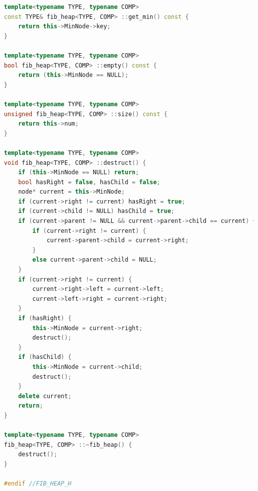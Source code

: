 \documentclass[a4paper]{article}
\begin{document}
\begin{lstlisting}[language=C++]
template<typename TYPE, typename COMP>
const TYPE& fib_heap<TYPE, COMP> ::get_min() const {
	return this->MinNode->key;
}

template<typename TYPE, typename COMP>
bool fib_heap<TYPE, COMP> ::empty() const {
	return (this->MinNode == NULL);
}

template<typename TYPE, typename COMP>
unsigned fib_heap<TYPE, COMP> ::size() const {
	return this->num;
}

template<typename TYPE, typename COMP>
void fib_heap<TYPE, COMP> ::destruct() {
	if (this->MinNode == NULL) return;
	bool hasRight = false, hasChild = false;
	node* current = this->MinNode;
	if (current->right != current) hasRight = true;
	if (current->child != NULL) hasChild = true;
	if (current->parent != NULL && current->parent->child == current) {
		if (current->right != current) {
			current->parent->child = current->right;
		}
		else current->parent->child = NULL;
	}
	if (current->right != current) {
		current->right->left = current->left;
		current->left->right = current->right;
	}
	if (hasRight) {
		this->MinNode = current->right;
		destruct();
	}
	if (hasChild) {
		this->MinNode = current->child;
		destruct();
	}
	delete current;
	return;
}

template<typename TYPE, typename COMP>
fib_heap<TYPE, COMP> ::~fib_heap() {
	destruct();
}

#endif //FIB_HEAP_H
\end{lstlisting}
\end{document}
